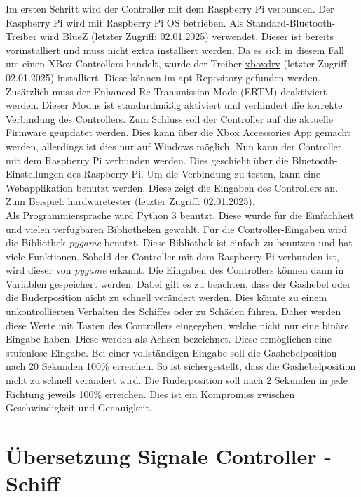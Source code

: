 Im ersten Schritt wird der Controller mit dem Raspberry Pi verbunden. Der Raspberry Pi wird mit Raspberry Pi OS betrieben.
Als Standard-Bluetooth-Treiber wird \href{https://www.bluez.org/}{BlueZ} (letzter Zugriff: 02.01.2025) verwendet. Dieser ist bereits vorinstalliert und muss 
nicht extra installiert werden. Da es sich in diesem Fall um einen XBox Controllers handelt, wurde der Treiber
\href{https://github.com/xboxdrv/xboxdrv}{xboxdrv} (letzter Zugriff: 02.01.2025) installiert. Diese können im apt-Repository gefunden werden.
Zusätzlich muss der Enhanced Re-Transmission Mode (ERTM) deaktiviert werden. Dieser Modus ist standardmäßig aktiviert und
verhindert die korrekte Verbindung des Controllers. Zum Schluss soll der Controller auf die aktuelle Firmware geupdatet werden.
Dies kann über die Xbox Accessories App gemacht werden, allerdings ist dies nur auf Windows möglich. Nun kann 
der Controller mit dem Raspberry Pi verbunden werden. Dies geschieht über die Bluetooth-Einstellungen des Raspberry Pi.
Um die Verbindung zu testen, kann eine Webapplikation benutzt werden. Diese zeigt die Eingaben des Controllers an. Zum 
Beispiel: \href{https://hardwaretester.com/gamepad}{hardwaretester} (letzter Zugriff: 02.01.2025).
\\
Als Programmiersprache wird Python 3 benutzt. Diese wurde für die Einfachheit und vielen verfügbaren Bibliotheken gewählt. 
Für die
Controller-Eingaben wird die Bibliothek \textit{pygame} benutzt. Diese Bibliothek ist einfach zu benutzen und hat viele Funktionen.
Sobald der Controller mit dem Raspberry Pi verbunden ist, wird dieser von \textit{pygame} erkannt. Die Eingaben des Controllers
können dann in Variablen gespeichert werden. Dabei gilt es zu beachten, dass der Gashebel oder die Ruderposition nicht
zu schnell verändert werden. Dies könnte zu einem unkontrollierten Verhalten des Schiffes oder zu Schäden führen. 
Daher werden diese Werte mit Tasten des
Controllers eingegeben, welche nicht nur eine binäre Eingabe haben. Diese werden als Achsen bezeichnet. Diese ermöglichen
eine stufenlose Eingabe. Bei einer vollständigen Eingabe soll die Gashebelposition nach 20 Sekunden 100\% erreichen.
So ist sichergestellt, dass die Gashebelposition nicht zu schnell verändert wird. Die Ruderposition soll nach 2 Sekunden
in jede Richtung jeweils 100\% erreichen. Dies ist ein Kompromiss zwischen Geschwindigkeit und Genauigkeit.

\section{Übersetzung Signale Controller - Schiff} \label{sec:signalControllerSchiff}

